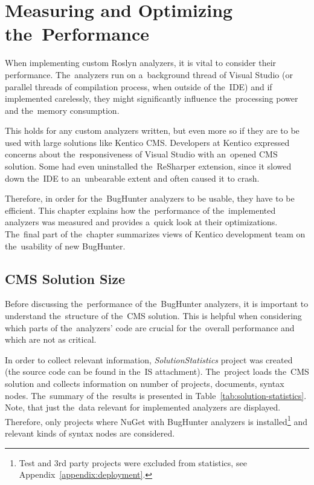 \documentclass[
  digital, %
  table,   %
  lof,     %
  lot,     %
  oneside,
]{fithesis3}
\begin{document}
\chapter{Measuring and Optimizing the~Performance}
\label{chap:performance}
When implementing custom Roslyn analyzers, it is vital to consider their performance. The~analyzers run on a~background thread of Visual Studio (or parallel threads of compilation process, when outside of the~IDE) and if implemented carelessly, they might significantly influence the~processing power and the~memory consumption.

This holds for any custom analyzers written, but even more so if they are to be used with large solutions like Kentico CMS. Developers at Kentico expressed concerns about the~responsiveness of Visual Studio with an~opened CMS solution. Some had even uninstalled the~ReSharper extension, since it slowed down the~IDE to an~unbearable extent and often caused it to crash. 

Therefore, in order for the~BugHunter analyzers to be usable, they have to be efficient. This chapter explains how the~performance of the~implemented analyzers was measured and provides a~quick look at their optimizations. The~final part of the~chapter summarizes views of Kentico development team on the~usability of new BugHunter.

\section{CMS Solution Size}
\label{sec:cms-solution-size}
Before discussing the~performance of the~BugHunter analyzers, it is important to understand the~structure of the~CMS solution. This is helpful when considering which parts of the~analyzers' code are crucial for the~overall performance and which are not as critical.

In order to collect relevant information, \textit{SolutionStatistics} project was created (the source code can be found in the~IS attachment). The~project loads the~CMS solution and collects information on number of projects, documents, syntax nodes. The~summary of the~results is presented in Table~\ref{tab:solution-statistics}. Note, that just the~data relevant for implemented analyzers are displayed. Therefore, only projects where NuGet with BugHunter analyzers is installed\footnote{Test and 3rd party projects were excluded from statistics, see Appendix~\ref{appendix:deployment}.} and relevant kinds of syntax nodes are considered.
\end{document}
